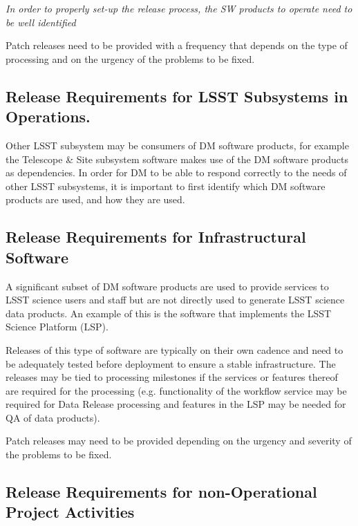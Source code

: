 \textit{In order to properly set-up the release process, the \gls{SW} products to operate need to be well identified}

Patch releases need to be provided with a frequency that depends on the type of processing
and on the urgency of the problems to be fixed.


\subsection{Release Requirements for \gls{LSST} Subsystems in \gls{Operations}.} \label{sec:otherreqs}

Other \gls{LSST} subsystem may be consumers of \gls{DM} software products, for example the Telescope \& Site subsystem software makes use of the \gls{DM} software products as dependencies. 
In order for \gls{DM} to be able to respond correctly to the needs of other \gls{LSST} subsystems, it is important to first identify which \gls{DM} software products are used, and how they are used.


\subsection{Release Requirements for Infrastructural Software} \label{sec:infreqs}

A significant subset of \gls{DM} software products are used to provide services to \gls{LSST} science users and staff but are not directly used to generate \gls{LSST} science data products. An example of this is the software that implements the \gls{LSST} \gls{Science Platform} (\gls{LSP}).

Releases of this type of software are typically on their own cadence and need to be adequately tested before deployment to ensure a stable infrastructure. The releases may be tied to processing milestones if the services or features thereof are required for the processing (e.g. functionality of the workflow service may be required for \gls{Data Release} processing and features in the \gls{LSP} may be needed for \gls{QA} of data products).

Patch releases may need to be provided depending on the urgency and severity of the problems to be fixed.


\subsection{Release Requirements for non-Operational Project Activities} \label{sec:nonopsreqs}

